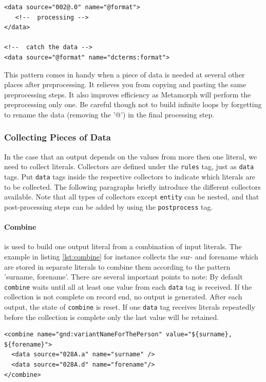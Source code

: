 \documentclass[12pt,a4paper]{article}
\begin{document}
\begin{lstlisting}[float=htb,label=lst:rec,caption=Prepending '@' to the literal name to enable recursive processing.]
<data source="002@.0" name="@format">
   <!--  processing -->
</data>

<!--  catch the data -->
<data source="@format" name="dcterms:format">
\end{lstlisting}

This pattern comes in handy when a piece of data is needed at several other places after preprocessing. It relieves you from copying and pasting the same preprocessing steps. It also improves efficiency as Metamorph will perform the preprocessing only one. Be careful though not to build infinite loops by forgetting to rename the data (removing the '@') in the final processing step.

\subsubsection{Collecting Pieces of Data}\label{collect}

In the case that an output depends on the values from more then one literal, we need to collect literals. Collectors are defined under the {\tt rules} tag, just as {\tt data} tags. Put {\tt data} tags inside the respective collectors to indicate which literals are to be collected. The following paragraphs briefly introduce the different collectors available. Note that all types of collectors except {\tt entity} can be nested, and that post-processing steps can be added by using the {\tt postprocess} tag. 


\paragraph{Combine}

is used to build one output literal from a combination of input literals. The  example in listing \ref{lst:combine} for instance collects the sur- and forename which are stored in separate literals to combine them according to the pattern 'surname, forename'.
There are several important points to note: By default {\tt combine} waits until all at least one value from each {\tt data} tag is received. If the collection is not complete on record end, no output is generated. After each output, the state of {\tt combine} is reset. If one {\tt data} tag receives literals repeatedly before the collection is complete only the last value will be retained.

\begin{lstlisting}[float=htb, label=lst:combine,caption=Combining data from two different data sources.]
<combine name="gnd:variantNameForThePerson" value="${surname}, ${forename}">
  <data source="028A.a" name="surname" />
  <data source="028A.d" name="forename"/>
</combine>
\end{lstlisting}
\end{document}
